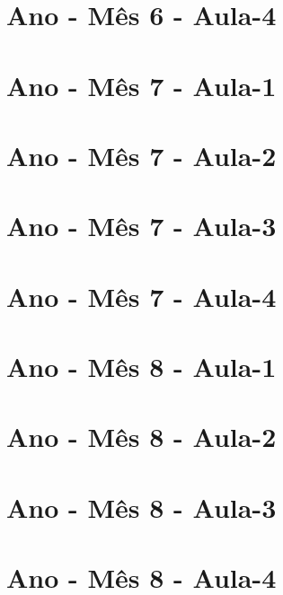 \begin{multicols}{2}
\section[\sffamily 3\textordmasculine\space Ano - Mês 6 - Aula-4]{\textordmasculine\space Ano - Mês 6 - Aula-4}


\section[\sffamily 3\textordmasculine\space Ano - Mês 7 - Aula-1]{\textordmasculine\space Ano - Mês 7 - Aula-1}


\section[\sffamily 3\textordmasculine\space Ano - Mês 7 - Aula-2]{\textordmasculine\space Ano - Mês 7 - Aula-2}


\section[\sffamily 3\textordmasculine\space Ano - Mês 7 - Aula-3]{\textordmasculine\space Ano - Mês 7 - Aula-3}


\section[\sffamily 3\textordmasculine\space Ano - Mês 7 - Aula-4]{\textordmasculine\space Ano - Mês 7 - Aula-4}


\section[\sffamily 3\textordmasculine\space Ano - Mês 8 - Aula-1]{\textordmasculine\space Ano - Mês 8 - Aula-1}


\section[\sffamily 3\textordmasculine\space Ano - Mês 8 - Aula-2]{\textordmasculine\space Ano - Mês 8 - Aula-2}


\section[\sffamily 3\textordmasculine\space Ano - Mês 8 - Aula-3]{\textordmasculine\space Ano - Mês 8 - Aula-3}


\section[\sffamily 3\textordmasculine\space Ano - Mês 8 - Aula-4]{\textordmasculine\space Ano - Mês 8 - Aula-4}


\end{multicols}
